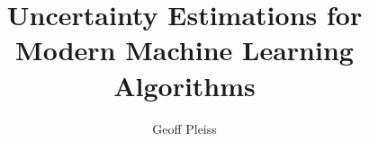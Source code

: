 \documentclass[phd,tocprelim]{cornell}
\title{Uncertainty Estimations for Modern Machine Learning Algorithms}
\author{Geoff Pleiss}
\begin{document}
\maketitle
\makecopyright

\begin{abstract}
  
\end{abstract}

\begin{biosketch}
  
\end{biosketch}

\begin{dedication}
  
\end{dedication}

\begin{acknowledgements}
  
\end{acknowledgements}

\contentspage
\tablelistpage
\figurelistpage
\normalspacing \setcounter{page}{1} 
\pagestyle{cornell} \addtolength{\parskip}{0.5\baselineskip}









\appendix


\end{document}
